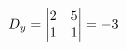 \documentclass[preview]{standalone}
\begin{document}
\begin{align*}
\special{dvisvgm:raw <g id='unique000'>}D_y=\begin{vmatrix} 2 & 5 \\ 1 & 1 \end{vmatrix}=-3\special{dvisvgm:raw </g>}
\end{align*}
\end{document}
